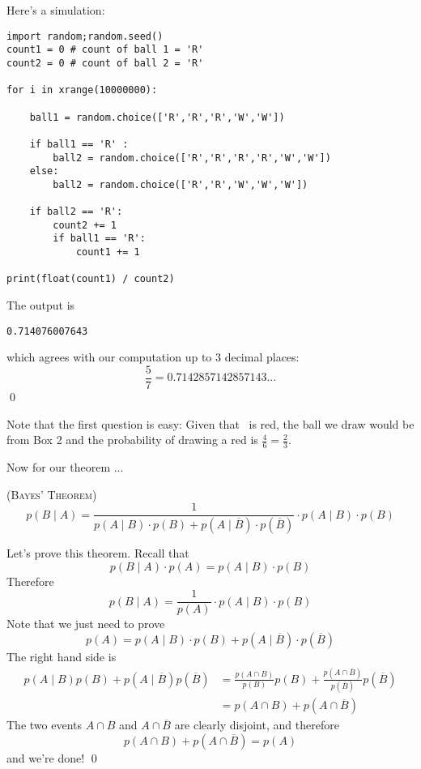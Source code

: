 Here's a simulation:
\begin{Verbatim}[frame=single, fontsize=\small]
import random;random.seed()
count1 = 0 # count of ball 1 = 'R'
count2 = 0 # count of ball 2 = 'R'

for i in xrange(10000000): 
 
    ball1 = random.choice(['R','R','R','W','W'])

    if ball1 == 'R' :
        ball2 = random.choice(['R','R','R','R','W','W'])
    else:
        ball2 = random.choice(['R','R','W','W','W'])
        
    if ball2 == 'R':
        count2 += 1
        if ball1 == 'R':
            count1 += 1

print(float(count1) / count2)
\end{Verbatim}
The output is 
\begin{Verbatim}[frame=single, fontsize=\small]
0.714076007643
\end{Verbatim}
which agrees with our computation up to 3 decimal places:
\[
\frac{5}{7} = 0.7142857142857143...
\]
\qed

\newpage

Note that the first question is easy:
Given that \BALLONE\ is red, the ball we draw would be from Box 2 and the 
probability of drawing a red is $\frac{4}{6} = \frac{2}{3}$.

Now for our theorem ...

\newpage
\begin{thm} \textsc{(Bayes' Theorem)}
\[
p(B \mid A) 
=  
\frac{1}{p(A \mid  B) \cdot p(B) + p(A \mid  \overline B) \cdot p(\overline B)}
\cdot 
p(A \mid  B) \cdot p(B)
\]
\end{thm}

Let's prove this theorem.
Recall that
\[
p(B \mid A) \cdot p(A) = p(A \mid B) \cdot p(B)
\]
Therefore
\[
p(B \mid A) = \frac{1}{p(A)} \cdot p(A \mid B) \cdot p(B)
\]
Note that we just need to prove
\[
p(A) = p(A \mid  B) \cdot p(B) + p(A \mid  \overline B) \cdot p(\overline B)
\]
The right hand side is
\begin{align*}
p(A \mid  B) p(B) + p(A \mid  \overline B)p(\overline B) 
&= \frac{p(A \cap B)}{p(B)} p(B) 
   + \frac{p(A \cap \overline{B})}{p(\overline B)} 
   p(\overline B) \\
&= p(A \cap B) + p(A \cap \overline{B}) 
\end{align*}
The two events $A \cap B$ and $A \cap \overline B$ are clearly
disjoint, and therefore
\[
p(A \cap B) + p(A \cap \overline{B}) = p(A)
\]
and we're done!
\qed



